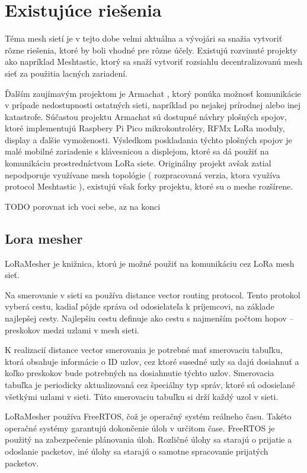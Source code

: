 \documentclass[slovak,master]{diploma}
\begin{document}
\chapter{Existujúce riešenia}
Téma mesh sietí je v tejto dobe velmi aktuálna a vývojári sa snažia vytvoriť rôzne riešenia, ktoré by boli vhodné pre rôzne účely.
Existujú rozvinuté projekty ako napríklad Meshtastic, ktorý sa snaží vytvoriť rozsiahlu decentralizovanú mesh sieť za použitia lacných zariadení.

Ďalším zaujímavým projektom je Armachat \cite{armachat}, ktorý ponúka možnosť komunikácie v prípade nedostupnosti ostatných sieti, napríklad po nejakej prírodnej alebo inej katastrofe.
Súčastou projektu Armachat sú dostupné návhry plošných spojov, ktoré implementujú Raspbery Pi Pico mikrokontroléry, RFMx LoRa moduly, display a ďalšie vymoženosti.
Výsledkom poskladania týchto plošných spojov je malé mobilné zariadenie s klávesnicou a displejom, ktoré sa dá použiť na komunikáciu prostredníctvom LoRa siete.
Originálny projekt avšak zatial nepodporuje využívane mesh topológie ( rozpracovaná verzia, ktora využíva protocol Meshtastic ), existujú však forky projektu, ktoré su o meshe rozšírene.

TODO porovnat ich voci sebe, az na konci

\section{Lora mesher}
LoRaMesher \cite{loramesher} je knižnica, ktorú je možné použiť na komunikáciu cez LoRa mesh sieť.

Na smerovanie v sieti sa používa distance vector routing protocol. Tento protokol vyberá cestu, kadiaľ pôjde správa od odosielateľa k príjemcovi, na základe 
najlepšej cesty. Najlepšiu cestu definuje ako cestu s najmenším počtom hopov -- preskokov medzi uzlami v mesh sieti.

K realizacií distance vector smerovania je potrebné mať smerovaciu tabuľku, ktorá obsahuje informácie o ID uzlov, cez ktoré susedné uzly sa dajú dosiahnuť a 
koľko preskokov bude potrebných na dosiahnutie týchto uzlov. Smerovacia tabuľka je periodicky aktualizovaná cez špeciálny typ správ, ktoré sú odosielané 
všetkými uzlami v sieti. Túto smerovaciu tabuľku si drží každý uzol v sieti.

LoRaMesher používa FreeRTOS, čož je operačný systém reálneho času. Takéto operačné systémy garantujú dokončenie úloh v určitom čase.
FreeRTOS je použitý na zabezpečenie plánovania úloh. Rozličné úlohy sa starajú o prijatie a odoslanie packetov, iné úlohy sa starajú o samotne 
spracovanie prijatých packetov.
\end{document}
